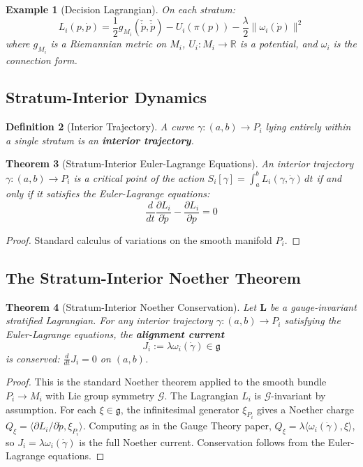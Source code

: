 \documentclass[11pt,a4paper]{article}
\newtheorem{theorem}{Theorem}[section]
\newtheorem{definition}[theorem]{Definition}
\newtheorem{example}[theorem]{Example}
\begin{document}
\begin{example}[Decision Lagrangian]
On each stratum:
\[
    L_i(p, \dot{p}) = \frac{1}{2} g_{M_i}(\check{\dot{p}}, \check{\dot{p}}) - U_i(\pi(p)) - \frac{\lambda}{2} \|\omega_i(\dot{p})\|^2
\]
where $g_{M_i}$ is a Riemannian metric on $M_i$, $U_i : M_i \to \mathbb{R}$ is a potential, and $\omega_i$ is the connection form.
\end{example}

\subsection{Stratum-Interior Dynamics}

\begin{definition}[Interior Trajectory]
A curve $\gamma : (a, b) \to P_i$ lying entirely within a single stratum is an \textbf{interior trajectory}.
\end{definition}

\begin{theorem}[Stratum-Interior Euler-Lagrange Equations]
An interior trajectory $\gamma : (a, b) \to P_i$ is a critical point of the action $S_i[\gamma] = \int_a^b L_i(\gamma, \dot{\gamma})\,dt$ if and only if it satisfies the Euler-Lagrange equations:
\[
    \frac{d}{dt}\frac{\partial L_i}{\partial \dot{p}} - \frac{\partial L_i}{\partial p} = 0
\]
\end{theorem}

\begin{proof}
Standard calculus of variations on the smooth manifold $P_i$.
\end{proof}

\subsection{The Stratum-Interior Noether Theorem}

\begin{theorem}[Stratum-Interior Noether Conservation]
Let $\mathbf{L}$ be a gauge-invariant stratified Lagrangian. For any interior trajectory $\gamma : (a, b) \to P_i$ satisfying the Euler-Lagrange equations, the \textbf{alignment current}
\[
    J_i := \lambda \omega_i(\dot{\gamma}) \in \mathfrak{g}
\]
is conserved: $\frac{d}{dt} J_i = 0$ on $(a, b)$.
\end{theorem}

\begin{proof}
This is the standard Noether theorem applied to the smooth bundle $P_i \to M_i$ with Lie group symmetry $\mathcal{G}$. The Lagrangian $L_i$ is $\mathcal{G}$-invariant by assumption. For each $\xi \in \mathfrak{g}$, the infinitesimal generator $\xi_{P_i}$ gives a Noether charge $Q_\xi = \langle \partial L_i / \partial \dot{p}, \xi_{P_i} \rangle$. Computing as in the Gauge Theory paper, $Q_\xi = \lambda \langle \omega_i(\dot{\gamma}), \xi \rangle$, so $J_i = \lambda \omega_i(\dot{\gamma})$ is the full Noether current. Conservation follows from the Euler-Lagrange equations.
\end{proof}
\end{document}
